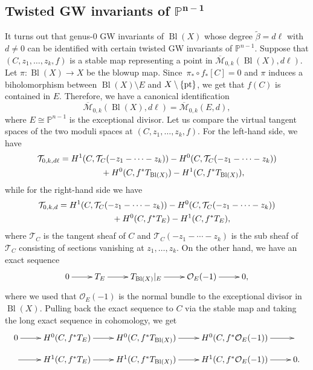 \documentclass[pdftex]{sigma}
\numberwithin{equation}{section}
\newcommand{\PP}{\mathbb{P}}
\newcommand{\T}{\mathcal{T}}
\begin{document}
\subsection[Twisted GW invariants of P\^\{n-1\}]{Twisted GW invariants of $\boldsymbol{\PP^{n-1}}$}\label{sec:proj-tw-GW}

It turns out that genus-0 GW invariants of $\operatorname{Bl}(X)$ whose degree $\widetilde{\beta}= d\ell$ with $d\neq 0$ can be identified with certain twisted GW invariants of $\PP^{n-1}$.
Suppose that $(C,z_1,\dots,z_k,f)$ is a stable map representing a point in $\overline{\mathcal{M}}_{0,k}(\operatorname{Bl}(X), d\ell)$. Let $\pi\colon \operatorname{Bl}(X)\to X$ be the blowup map. Since~${\pi_*\circ f_*[C]=0}$ and $\pi$ induces a biholomorphism between $\operatorname{Bl}(X)\setminus{E}$ and $X\setminus{\{\rm pt \}}$, we get that $f(C)$ is contained in $E$. Therefore, we have a canonical identification
\[
\overline{\mathcal{M}}_{0,k}(\operatorname{Bl}(X), d\ell) =
\overline{\mathcal{M}}_{0,k}(E, d),
\]
where $E\cong \PP^{n-1}$ is the exceptional divisor. Let us compare the virtual tangent spaces of the two moduli spaces at $(C,z_1,\dots,z_k,f)$. For the left-hand side, we have
\begin{gather*}
\T_{0,k,d\ell} =
H^1(C,\T_C(-z_1-\dots -z_k)) -
H^0(C,\T_C(-z_1-\dots -z_k)) \\
\hphantom{\T_{0,k,d\ell} =}{}
+
H^0(C,f^*T_{\operatorname{Bl}(X)}) -
H^1(C, f^*T_{\operatorname{Bl}(X)}),
\end{gather*}
while for the right-hand side we have
\begin{gather*}
\T_{0,k,d} =
H^1(C,\T_C(-z_1-\dots -z_k)) -
H^0(C,\T_C(-z_1-\dots -z_k)) \\
\hphantom{\T_{0,k,d} =}{} +
H^0(C,f^*T_{E}) -
H^1(C, f^*T_{E}),
\end{gather*}
where $\T_C$ is the tangent sheaf of $C$ and $\T_C(-z_1-\cdots -z_k)$ is the sub sheaf of $\T_C$ consisting of sections vanishing at $z_1,\dots, z_k$.
On the other hand, we have an exact sequence
\[
\xymatrix{0\ar[r] &
 T_E \ar[r] &
 T_{\operatorname{Bl}(X)}|_E \ar[r] &
 \mathcal{O}_E(-1) \ar[r] & 0,}
\]
where we used that $\mathcal{O}_E(-1)$ is the normal bundle to the exceptional divisor in $\operatorname{Bl}(X)$. Pulling back the exact sequence to $C$ via the stable map and taking the long exact sequence in cohomology, we get
\[
\xymatrix@R=0.8em{0\ar[r] &
 H^0(C,f^*T_E) \ar[r] &
 H^0(C,f^*T_{\operatorname{Bl}(X)}) \ar[r] &
 H^0(C,f^*\mathcal{O}_E(-1)) \ar[r] & \\
 {}\ar[r] &
H^1(C,f^*T_E) \ar[r] &
H^1(C,f^*T_{\operatorname{Bl}(X)}) \ar[r] &
H^1(C,f^*\mathcal{O}_E(-1)) \ar[r] & 0.}
\]
\end{document}
